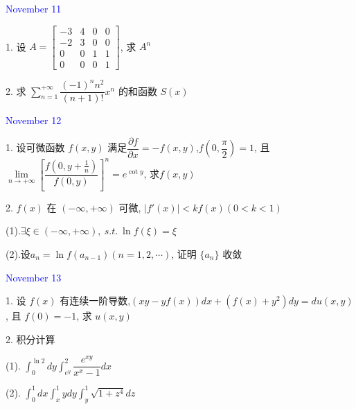 \textcolor{blue}{November 11}

1. 设 $ A=
\begin{bmatrix}
	-3 & 4 & 0 & 0 \\
	-2 & 3 & 0 & 0 \\
	 0 & 0 & 1 & 1 \\
	 0 & 0 & 0 & 1
\end{bmatrix}$, 求 $A^{n}$
\begin{solution}
	
\end{solution}

2. 求 $\displaystyle{\sum\limits_{n=1}^{+\infty}\dfrac{(-1)^{n}n^{2}}{(n+1)!}x^{n}}$ 的和函数 $S(x)$
\begin{solution}
	
\end{solution}

\textcolor{blue}{November 12}

1. 设可微函数 $f(x,y)$ 满足$\dfrac{\partial f}{\partial x}=-f(x,y)$,$f(0,\dfrac{\pi}{2})=1$,
且 $\lim\limits_{n\to +\infty}\left[\dfrac{f(0,y+\frac{1}{n})}{f(0,y)} \right]^{n}=e^{\cot y} $, 求$f(x,y)$
\begin{solution}
	
\end{solution}

2. $f(x)$ 在 $(-\infty,+\infty)$ 可微, $|f'(x)|<kf(x)(0<k<1)$

(1).$\exists \xi\in(-\infty,+\infty),\ s.t.\ \ln f(\xi)=\xi$

(2).设$a_{n}=\ln f(a_{n-1})(n=1,2,\cdots)$, 证明 $\{a_{n}\}$ 收敛
\begin{solution}
	
\end{solution}

\textcolor{blue}{November 13}

1. 设 $f(x)$ 有连续一阶导数,$(xy-yf(x))dx+(f(x)+y^2)dy=du(x,y)$, 且 $f(0)=-1$, 求 $u(x,y)$
\begin{solution}
	
\end{solution}

2. 积分计算

(1). $\displaystyle{\int_{0}^{\ln 2}dy\int_{e^{y}}^{2}\dfrac{e^{xy}}{x^{x}-1}dx}$

(2). $\displaystyle{\int_{0}^{1}dx\int_{x}^{1}ydy\int_{y}^{1}\sqrt{1+z^4}dz}$
\begin{solution}
	
\end{solution}


